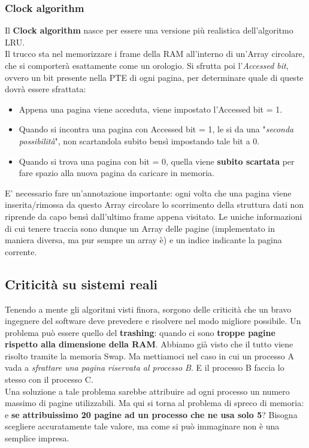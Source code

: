 \documentclass[12pt]{report}
\begin{document}
	\subsubsection*{Clock algorithm}
	Il \textbf{Clock algorithm} nasce per essere una versione più realistica dell'algoritmo LRU.\\
	Il trucco sta nel memorizzare i frame della RAM all'interno di un'Array circolare, che si comporterà esattamente come un orologio. Si sfrutta poi l'\textit{Accessed bit}, ovvero un bit presente nella PTE di ogni pagina, per determinare quale di queste dovrà essere sfrattata:
	\begin{itemize}
		\item Appena una pagina viene acceduta, viene impostato l'Accessed bit = 1.
		
		\item Quando si incontra una pagina con Accessed bit = 1, le si da una "\textit{seconda possibilità}", non scartandola subito bensì impostando tale bit a 0.
		
		\item Quando si trova una pagina con bit = 0, quella viene \textbf{subito scartata} per fare spazio alla nuova pagina da caricare in memoria.
	\end{itemize}
	E' necessario fare un'annotazione importante: ogni volta che una pagina viene inserita/rimossa da questo Array circolare lo scorrimento della struttura dati non riprende da capo bensì dall'ultimo frame appena visitato. Le uniche informazioni di cui tenere traccia sono dunque un Array delle pagine (implementato in maniera diversa, ma pur sempre un array è) e un indice indicante la pagina corrente.
	
	\subsection{Criticità su sistemi reali}
	Tenendo a mente gli algoritmi visti finora, sorgono delle criticità che un bravo ingegnere del software deve prevedere e risolvere nel modo migliore possibile. Un problema può essere quello del \textbf{trashing}: quando ci sono \textbf{troppe pagine rispetto alla dimensione della RAM}. Abbiamo già visto che il tutto viene risolto tramite la memoria Swap. Ma mettiamoci nel caso in cui un processo A vada a \textit{sfrattare una pagina riservata al processo B}. E il processo B faccia lo stesso con il processo C.\\
	Una soluzione a tale problema sarebbe attribuire ad ogni processo un numero massimo di pagine utilizzabili. Ma qui si torna al problema di spreco di memoria: e \textbf{se attribuissimo 20 pagine ad un processo che ne usa solo 5}? Bisogna scegliere accuratamente tale valore, ma come si può immaginare non è una semplice impresa.
	
\end{document}
